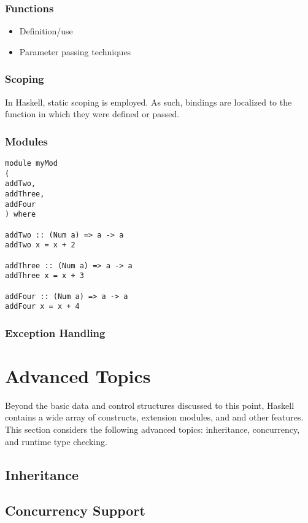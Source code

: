 \documentclass[titlepage,12pt]{article}
\newcommand{\bi}{\begin{itemize}}
\newcommand{\ei}{\end{itemize}}
\begin{document}
\subsubsection{Functions}
\bi
    \item Definition/use
    \item Parameter passing techniques
\ei

\subsubsection{Scoping}
In Haskell, static scoping is employed.  As such, bindings are localized
to the function in which they were defined or passed.

\subsubsection{Modules}
\begin{verbatim}
module myMod 
( 
addTwo,
addThree,
addFour
) where

addTwo :: (Num a) => a -> a
addTwo x = x + 2

addThree :: (Num a) => a -> a
addThree x = x + 3

addFour :: (Num a) => a -> a
addFour x = x + 4
\end{verbatim}
\subsubsection{Exception Handling}



\section{Advanced Topics}
Beyond the basic data and control structures discussed to this point,
Haskell contains a wide array of constructs, extension modules, and
and other features.  This section considers the following advanced
topics: inheritance, concurrency, and runtime type checking.

\subsection{Inheritance}


\subsection{Concurrency Support}
\end{document}
